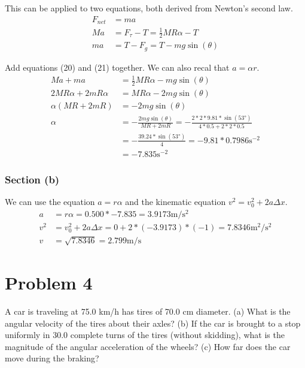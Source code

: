 \documentclass[12pt]{article}
\begin{document}
This can be applied to two equations, both derived from Newton's second law.
\begin{align}
    F_{net} &=  ma\\
    Ma  &=  F_\tau - T
        =   \frac{1}{2}MR\alpha - T\\
    ma  &=  T - F_g
        =   T - mg\sin(\theta)
\end{align}

Add equations (20) and (21) together. We can also recal that \(a = \alpha r\).
\begin{align}
    Ma + ma &=  \frac{1}{2}MR\alpha - mg\sin(\theta)\\
    2MR\alpha + 2mR\alpha   &=  MR\alpha - 2mg\sin(\theta)\\
    \alpha (MR + 2mR)   &=  -2mg\sin(\theta)\\
    \alpha  &=  -\frac{2mg\sin(\theta)}{MR + 2mR}
        =   -\frac{2*2*9.81*\sin(53\unit{\degree})}{4*0.5 + 2*2*0.5}\\
        &=  -\frac{39.24*\sin(53\unit{\degree})}{4}
        =   -9.81*0.7986 \unit{\second^{-2}}\\
        &=  \boxed{-7.835 \unit{\second^{-2}}}
\end{align}

\subsubsection{Section (b)}
We can use the equation $a = r\alpha$ and the kinematic equation $v^2 = v_0^2 + 2a\Delta x$.
\begin{align}
    a   &=  r\alpha 
        =   0.500 * -7.835
        =   3.9173 \unit{\meter/\second^2}\\
    v^2 &=  v_0^2 + 2a\Delta x
        =   0 + 2 * (-3.9173) * (-1)
        =   7.8346 \unit{\meter^2/\second^2}\\
    v   &=  \sqrt{7.8346}
        =   \boxed{2.799 \unit{\meter/\second}}
\end{align}


\pagebreak
\section{Problem 4}
A car is traveling at 75.0 km/h has tires of 70.0 cm diameter. (a) What is the angular velocity of the tires about their axles? (b) If the car is brought to a stop uniformly in 30.0 complete turns of the tires (without skidding), what is the magnitude of the angular acceleration of the wheels? (c) How far does the car move during the braking?
\end{document}
